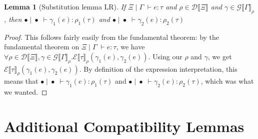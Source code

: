 \documentclass[a4paper, 11pt]{report}
\newtheorem{lemma}[theorem]{Lemma}
\theoremstyle{definition}
\newcommand{\expr}{e}
\newcommand{\typ}{\tau}
\newcommand{\venv}{\Gamma}
\newcommand{\tenv}{\Xi}
\newcommand{\emptenv}{\bullet}
\newcommand{\empvenv}{\bullet}
\newcommand{\jdg}[4]{#1 \; | \; #2 \; \vdash #3 : #4}
\newcommand{\ExpInp}[2]{\mathcal{E} \llbracket #1 \rrbracket_{#2}}
\newcommand{\VenvInp}[2]{\mathcal{G} \llbracket #1 \rrbracket_{#2}}
\newcommand{\TenvInp}[1]{\mathcal{D} \llbracket #1 \rrbracket}
\begin{document}
\begin{lemma}[Substitution lemma LR]\label{lem:subst_LR}
  If $\jdg{\tenv}{\venv}{\expr}{\typ}$ and $\rho \in \TenvInp{\tenv}$ and $\gamma \in \VenvInp{\venv}{\rho}$, then $\jdg{\emptenv}{\empvenv}{\gamma_1(\expr)}{\rho_1(\typ)}$ and $\jdg{\emptenv}{\empvenv}{\gamma_2(\expr)}{\rho_2(\typ)}$
\end{lemma}
\begin{proof}
  This follows fairly easily from the fundamental theorem: by the fundamental theorem on $\jdg{\tenv}{\venv}{\expr}{\typ}$, we have $\forall \rho \in \TenvInp{\tenv}, \gamma \in \VenvInp{\venv}{\rho} . 
  \ExpInp{\typ}{\rho}(\gamma_1(\expr), \gamma_2(\expr))$. Using our $\rho$ and $\gamma$, we get $\ExpInp{\typ}{\rho}(\gamma_1(\expr), \gamma_2(\expr))$. By definition of the expression interpretation, this means that $\jdg{\emptenv}{\empvenv}{\gamma_1(\expr)}{\rho_1(\typ)}$ and $\jdg{\emptenv}{\empvenv}{\gamma_2(\expr)}{\rho_2(\typ)}$, which was what we wanted.
\end{proof}

\chapter{Additional Compatibility Lemmas}\label{appendix:CL_extra}
\end{document}
